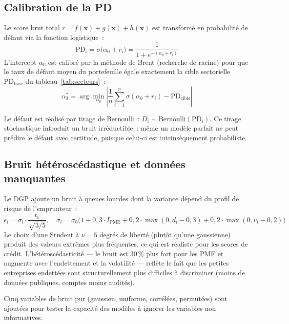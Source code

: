 \documentclass[12pt, a4paper, twoside, openright]{report}
\theoremstyle{definition}
\begin{document}
\subsection{Calibration de la PD}

Le score brut total $r = f(\mathbf{x}) + g(\mathbf{x}) + h(\mathbf{x})$ est transformé en probabilité de défaut via la fonction logistique~:
%
\begin{equation}
\label{eq:pd_calibration}
\text{PD}_i = \sigma\!\bigl(\alpha_0 + r_i\bigr) = \frac{1}{1 + e^{-(\alpha_0 + r_i)}}
\end{equation}
%
L'intercept $\alpha_0$ est calibré par la méthode de Brent (recherche de racine) pour que le taux de défaut moyen du portefeuille égale exactement la cible sectorielle $\text{PD}_{\text{base}}$ du tableau~\ref{tab:secteurs}~:
%
\begin{equation}
\alpha_0^* = \arg\min_{\alpha_0} \left| \frac{1}{n} \sum_{i=1}^n \sigma(\alpha_0 + r_i) - \text{PD}_{\text{cible}} \right|
\end{equation}

Le défaut est réalisé par tirage de Bernoulli~: $D_i \sim \text{Bernoulli}(\text{PD}_i)$.
Ce tirage stochastique introduit un bruit irréductible~: même un modèle parfait ne peut prédire le défaut avec certitude, puisque celui-ci est intrinsèquement probabiliste.

\subsection{Bruit hétéroscédastique et données manquantes}

Le DGP ajoute un bruit à queues lourdes dont la variance dépend du profil de risque de l'emprunteur~:
%
\begin{equation}
\epsilon_i = \sigma_i \cdot \frac{t_5}{\sqrt{3/5}}, \quad \sigma_i = \sigma_0 \bigl(1 + 0{,}3 \cdot I_{\text{PME}} + 0{,}2 \cdot \max(0, d_i - 0{,}3) + 0{,}2 \cdot \max(0, v_i - 0{,}2)\bigr)
\end{equation}
%
Le choix d'une Student à $\nu = 5$ degrés de liberté (plutôt qu'une gaussienne) produit des valeurs extrêmes plus fréquentes, ce qui est réaliste pour les scores de crédit.
L'hétéroscédasticité --- le bruit est 30\,\% plus fort pour les PME et augmente avec l'endettement et la volatilité --- reflète le fait que les petites entreprises endettées sont structurellement plus difficiles à discriminer (moins de données publiques, comptes moins audités).

Cinq variables de bruit pur (gaussien, uniforme, corrélées, permutées) sont ajoutées pour tester la capacité des modèles à ignorer les variables non informatives.
\end{document}

